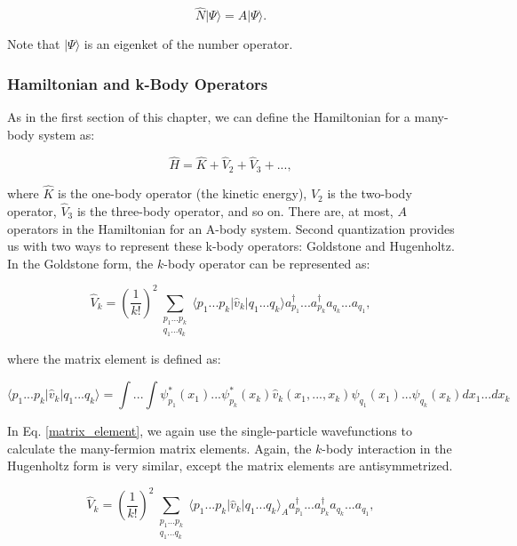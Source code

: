 	\begin{equation}
		\hat{N}|\Psi\rangle = A|\Psi\rangle.
	\end{equation}

	Note that $|\Psi\rangle$ is an eigenket of the number operator.

	\subsubsection*{Hamiltonian and k-Body Operators}

	As in the first section of this chapter, we can define the Hamiltonian for a many-body system as:

	\begin{equation} \label{hamiltonian}
		\hat{H} = \hat{K} + \hat{V}_2 + \hat{V}_3 + ... ,
	\end{equation}

	where $\hat{K}$ is the one-body operator (the kinetic energy), $\hat{V}_2$ is the two-body operator, $\hat{V}_3$ is the three-body operator, and so on.  There are, at most, $A$ operators in the Hamiltonian for an A-body system. Second quantization provides us with two ways to represent these k-body operators: Goldstone and Hugenholtz. In the Goldstone form, the $k$-body operator can be represented as:

	\begin{equation}
		\hat{V}_k = (\frac{1}{k!})^2\sum_{\substack{p_1...p_k \\ q_1...q_k}} \langle p_1 ... p_k | \hat{v}_k | q_1 ... q_k \rangle a^\dagger_{p_1}...a^\dagger_{p_k}a_{q_k}...a_{q_1},
	\end{equation}

	where the matrix element is defined as:

	\begin{equation}\label{matrix_element}
		\langle p_1 ... p_k |\hat{v}_k | q_1...q_k \rangle = \int ... \int \psi^*_{p_1}(x_1)...\psi^*_{p_k}(x_k)\hat{v}_k(x_1,...,x_k)\psi_{q_1}(x_1) ... \psi_{q_k}(x_k)dx_1...dx_k
	\end{equation}

	In Eq. \ref{matrix_element}, we again use the single-particle wavefunctions to calculate the many-fermion matrix elements. Again, the $k$-body interaction in the Hugenholtz form is very similar, except the matrix elements are antisymmetrized.

		\begin{equation}
		\hat{V}_k = (\frac{1}{k!})^2\sum_{\substack{p_1...p_k \\ q_1...q_k}} \langle p_1 ... p_k | \hat{v}_k | q_1 ... q_k \rangle_A a^\dagger_{p_1}...a^\dagger_{p_k}a_{q_k}...a_{q_1},
	\end{equation}

